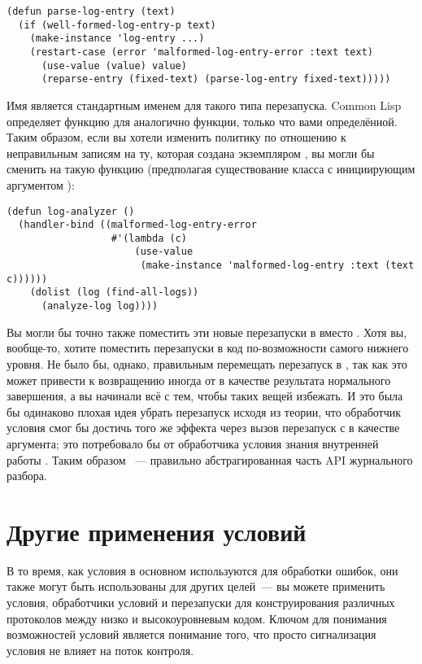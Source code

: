 \begin{lstlisting}
(defun parse-log-entry (text)
  (if (well-formed-log-entry-p text)
    (make-instance 'log-entry ...)
    (restart-case (error 'malformed-log-entry-error :text text)
      (use-value (value) value)
      (reparse-entry (fixed-text) (parse-log-entry fixed-text)))))
\end{lstlisting}

Имя  является стандартным именем для такого типа перезапуска. Common Lisp
определяет функцию для  аналогично  функции, только
что вами определённой. Таким образом, если вы хотели изменить политику по отношению к
неправильным записям на ту, которая создана экземпляром , вы
могли бы сменить  на такую функцию (предполагая существование
 класса с инициирующим аргументом ):

\begin{lstlisting}
(defun log-analyzer ()
  (handler-bind ((malformed-log-entry-error
                  #'(lambda (c)
                      (use-value
                       (make-instance 'malformed-log-entry :text (text c))))))
    (dolist (log (find-all-logs))
      (analyze-log log))))
\end{lstlisting}

Вы могли бы точно также поместить эти новые перезапуски в  вместо
. Хотя вы, вообще-то, хотите поместить перезапуски в код
по-возможности самого нижнего уровня. Не было бы, однако, правильным перемещать перезапуск
 в , так как это может привести к возвращению
иногда  от  в качестве результата нормального завершения,
а вы начинали всё с тем, чтобы таких вещей избежать. И это была бы одинаково плохая идея
убрать перезапуск  исходя из теории, что обработчик условия смог бы
достичь того же эффекта через вызов перезапуск  с  в качестве
аргумента; это потребовало бы от обработчика условия знания внутренней работы
. Таким образом ~--- правильно абстрагированная
часть API журнального разбора.

\section{Другие применения условий}

В то время, как условия в основном используются для обработки ошибок, они также могут быть
использованы для других целей~--- вы можете применить условия, обработчики условий и
перезапуски для конструирования различных протоколов между низко и высокоуровневым
кодом. Ключом для понимания возможностей условий является понимание того, что просто
сигнализация условия не влияет на поток контроля.

